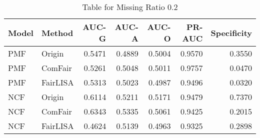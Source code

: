 \begin{table}
\centering
\caption{Table for Missing Ratio 0.2}
\label{tab:missing_0.2}
\begin{tabular}{llrrrrr}
\toprule
Model &   Method &  AUC-G &  AUC-A &  AUC-O &  PR-AUC &  Specificity \\
\midrule
  PMF &   Origin & 0.5471 & 0.4889 & 0.5004 &  0.9570 &       0.3550 \\
  PMF &  ComFair & 0.5261 & 0.5048 & 0.5011 &  0.9757 &       0.0470 \\
  PMF & FairLISA & 0.5313 & 0.5023 & 0.4987 &  0.9496 &       0.0320 \\
  NCF &   Origin & 0.6114 & 0.5211 & 0.5171 &  0.9479 &       0.7370 \\
  NCF &  ComFair & 0.6343 & 0.5335 & 0.5061 &  0.9425 &       0.2015 \\
  NCF & FairLISA & 0.4624 & 0.5139 & 0.4963 &  0.9325 &       0.2898 \\
\bottomrule
\end{tabular}
\end{table}
